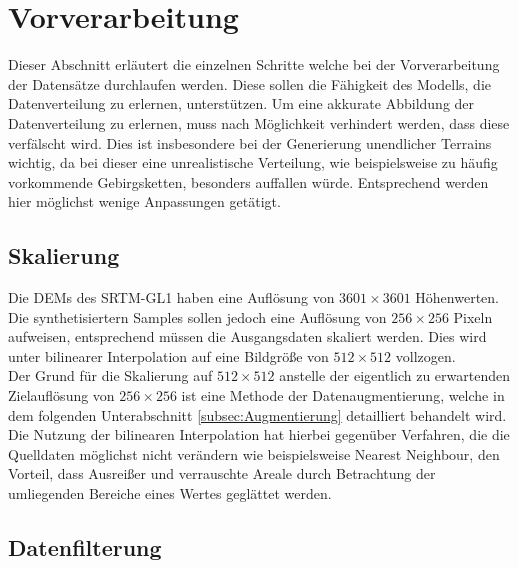 \section{Vorverarbeitung}

Dieser Abschnitt erläutert die einzelnen Schritte welche bei der Vorverarbeitung der Datensätze durchlaufen werden. Diese sollen die Fähigkeit des Modells, die Datenverteilung zu erlernen, unterstützen. Um eine akkurate Abbildung der Datenverteilung zu erlernen, muss nach Möglichkeit verhindert werden, dass diese verfälscht wird. Dies ist insbesondere bei der Generierung unendlicher Terrains wichtig, da bei dieser eine unrealistische Verteilung, wie beispielsweise zu häufig vorkommende Gebirgsketten, besonders auffallen würde. Entsprechend werden hier möglichst wenige Anpassungen getätigt.

\subsection{Skalierung}

Die \ac{DEM}s des SRTM-GL1 haben eine Auflösung von $3601\times3601$ Höhenwerten. Die synthetisiertern Samples sollen jedoch eine Auflösung von $256\times256$ Pixeln aufweisen, entsprechend müssen die Ausgangsdaten skaliert werden. Dies wird unter bilinearer Interpolation auf eine Bildgröße von $512\times512$ vollzogen. \\ 
Der Grund für die Skalierung auf $512\times512$ anstelle der eigentlich zu erwartenden Zielauflösung von $256\times256$ ist eine Methode der Datenaugmentierung, welche in dem folgenden Unterabschnitt \ref{subsec:Augmentierung} detailliert behandelt wird. \\
Die Nutzung der bilinearen Interpolation hat hierbei gegenüber Verfahren, die die Quelldaten möglichst nicht verändern wie beispielsweise Nearest Neighbour, den Vorteil, dass Ausreißer und verrauschte Areale durch Betrachtung der umliegenden Bereiche eines Wertes geglättet werden. 

\subsection{Datenfilterung}

